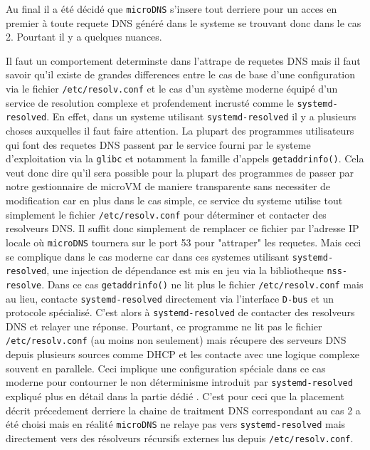 \documentclass[12pt]{article}
\begin{document}
Au final il a été décidé que \texttt{microDNS} s'insere tout derriere pour un acces en premier à toute requete DNS généré dans le systeme se trouvant donc dans le cas 2. Pourtant il y a quelques nuances.

Il faut un comportement determinste dans l'attrape de requetes DNS mais il faut savoir qu'il existe de grandes differences entre le cas de base d'une configuration via le fichier \texttt{/etc/resolv.conf} et le cas d'un système moderne équipé d'un service de resolution complexe et profendement incrusté comme le \texttt{systemd-resolved}. En effet, dans un systeme utilisant \texttt{systemd-resolved} il y a plusieurs choses auxquelles il faut faire attention. La plupart des programmes utilisateurs qui font des requetes DNS passent par le service fourni par le systeme d'exploitation via la \texttt{glibc} et notamment la famille d'appels \lstinline|getaddrinfo()|. Cela veut donc dire qu'il sera possible pour la plupart des programmes de passer par notre gestionnaire de microVM de maniere transparente sans necessiter de modification car en plus dans le cas simple, ce service du systeme utilise tout simplement le fichier \texttt{/etc/resolv.conf} pour déterminer et contacter des resolveurs DNS. Il suffit donc simplement de remplacer ce fichier par l'adresse IP locale où \texttt{microDNS} tournera sur le port 53 pour "attraper" les requetes. Mais ceci se complique dans le cas moderne car dans ces systemes utilisant \texttt{systemd-resolved}, une injection de dépendance est mis en jeu via la bibliotheque \texttt{nss-resolve}. Dans ce cas \lstinline|getaddrinfo()| ne lit plus le fichier \texttt{/etc/resolv.conf} mais au lieu, contacte \texttt{systemd-resolved} directement via l'interface \texttt{D-bus} et un protocole spécialisé. C'est alors à \texttt{systemd-resolved} de contacter des resolveurs DNS et relayer une réponse. Pourtant, ce programme ne lit pas le fichier \texttt{/etc/resolv.conf} (au moins non seulement) mais récupere des serveurs DNS depuis plusieurs sources comme DHCP et les contacte avec une logique complexe souvent en parallele. Ceci implique une configuration spéciale dans ce cas moderne pour contourner le non déterminisme introduit par \texttt{systemd-resolved} expliqué plus en détail dans la partie dédié . C'est pour ceci que la placement décrit précedement derriere la chaine de traitment DNS correspondant au cas 2 a été choisi mais en réalité \texttt{microDNS} ne relaye pas vers \texttt{systemd-resolved} mais directement vers des résolveurs récursifs externes lus depuis \texttt{/etc/resolv.conf}.
\end{document}
